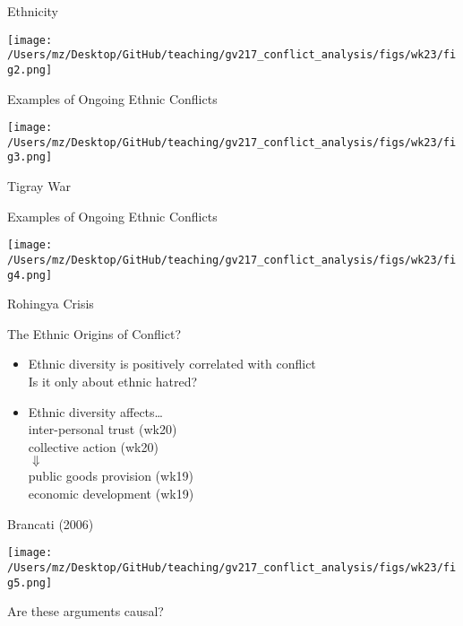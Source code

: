 \documentclass{beamer}
\begin{document}
\begin{frame}{Ethnicity}
    \pause
    \begin{center}
        \texttt{[image: /Users/mz/Desktop/GitHub/teaching/gv217\_conflict\_analysis/figs/wk23/fig2.png]}
    \end{center}
\end{frame}

\begin{frame}{Examples of Ongoing Ethnic Conflicts}
    \pause
    \begin{center}
        \texttt{[image: /Users/mz/Desktop/GitHub/teaching/gv217\_conflict\_analysis/figs/wk23/fig3.png]}
    \end{center}
    \pause Tigray War
\end{frame}

\begin{frame}{Examples of Ongoing Ethnic Conflicts}
    \pause
    \begin{center}
        \texttt{[image: /Users/mz/Desktop/GitHub/teaching/gv217\_conflict\_analysis/figs/wk23/fig4.png]}
    \end{center}
    \pause Rohingya Crisis
\end{frame}

\begin{frame}{The Ethnic Origins of Conflict?}
    \begin{itemize}
        \pause\item Ethnic diversity is positively correlated with conflict\\
        \pause      Is it only about ethnic hatred?
        \pause\item Ethnic diversity affects\dots\\
        \pause      inter-personal trust (wk20)\\
        \pause      collective action (wk20)\\
        \pause      \(\Downarrow\)\\
        \pause      public goods provision (wk19)\\
        \pause      economic development (wk19)
    \end{itemize}
\end{frame}

\begin{frame}{Brancati (2006)}
    \pause
    \begin{center}
        \texttt{[image: /Users/mz/Desktop/GitHub/teaching/gv217\_conflict\_analysis/figs/wk23/fig5.png]}
    \end{center}
    \pause Are these arguments causal?
\end{frame}
\end{document}
